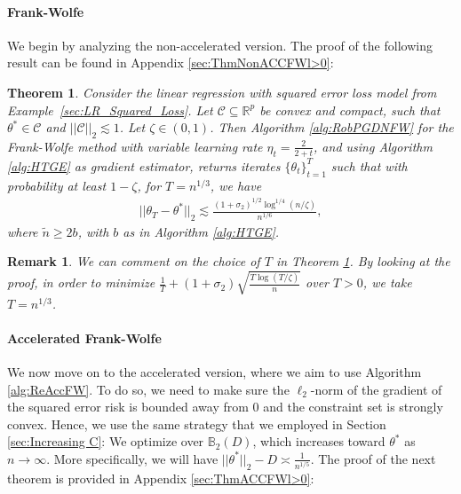 \documentclass{article}
\newtheorem{theorem}{Theorem}
\newtheorem{remark}{\textbf{Remark}}
\begin{document}
\paragraph{Frank-Wolfe}

We begin by analyzing the non-accelerated version. The proof of the following result can be found in Appendix \ref{sec:ThmNonACCFWl>0}:

\begin{theorem}
\label{theorem:HT_NonAccFW}
Consider the linear regression with squared error loss model from Example~\ref{sec:LR_Squared_Loss}. Let $\mathcal{C} \subseteq \mathbb{R}^p$ be convex and compact, such that $\theta^* \in \mathcal{C}$ and $||\mathcal{C}||_2 \lesssim 1$. Let $\zeta \in (0, 1)$. Then Algorithm \ref{alg:RobPGDNFW} for the Frank-Wolfe method with variable learning rate $\eta_t = \frac{2}{2 + t}$, and using Algorithm \ref{alg:HTGE} as gradient estimator, returns iterates $\{\theta_t\}_{t = 1}^T$ such that with probability at least $1 - \zeta$, for $T = n^{1/3}$, we have
\begin{align}
\label{eq:NotAccFW_HT}
||\theta_T - \theta^*||_2 \lesssim \frac{(1 + \sigma_2)^{1/2}\log^{1/4}(n/\zeta)}{n^{1/6}},
\end{align}
where $\widetilde{n} \geq 2b$, with $b$ as in Algorithm \ref{alg:HTGE}.
\end{theorem}

\begin{remark}
We can comment on the choice of $T$ in Theorem \ref{theorem:HT_NonAccFW}. By looking at the proof, in order to minimize $\frac{1}{T} + (1 + \sigma_2)\sqrt{\frac{T\log(T/\zeta)}{n}}$ over $T > 0$, we take $T = n^{1/3}$.
\end{remark}

\paragraph{Accelerated Frank-Wolfe}

We now move on to the accelerated version, where we aim to use Algorithm \ref{alg:ReAccFW}. To do so, we need to make sure the $\ell_2$-norm of the gradient of the squared error risk is bounded away from $0$ and the constraint set is strongly convex. Hence, we use the same strategy that we employed in Section \ref{sec:Increasing C}: We optimize over $\mathbb{B}_2(D)$, which increases toward $\theta^*$ as $n \rightarrow \infty$. More specifically, we will have $||\theta^*||_2 - D \asymp \frac{1}{n^{1/5}}$. The proof of the next theorem is provided in Appendix \ref{sec:ThmACCFWl>0}:
\end{document}

